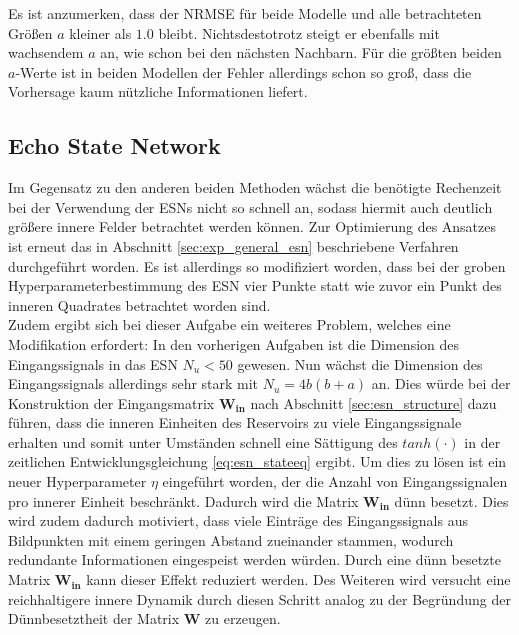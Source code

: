 Es ist anzumerken, dass der NRMSE für beide Modelle und alle betrachteten Größen $a$ kleiner als $1.0$ bleibt. Nichtsdestotrotz steigt er ebenfalls mit wachsendem $a$ an, wie schon bei den nächsten Nachbarn. Für die größten beiden $a$-Werte ist in beiden Modellen der Fehler allerdings schon so groß, dass die Vorhersage kaum nützliche Informationen liefert.

\FloatBarrier
\subsection{Echo State Network}
Im Gegensatz zu den anderen beiden Methoden wächst die benötigte Rechenzeit bei der Verwendung der \textsc{ESN}s nicht so schnell an, sodass hiermit auch deutlich größere innere Felder betrachtet werden können. Zur Optimierung des Ansatzes ist erneut das in Abschnitt \ref{sec:exp_general_esn} beschriebene Verfahren durchgeführt worden. Es ist allerdings so modifiziert worden, dass bei der groben Hyperparameterbestimmung des \textsc{ESN} vier Punkte statt wie zuvor ein Punkt des inneren Quadrates betrachtet worden sind.\\

Zudem ergibt sich bei dieser Aufgabe ein weiteres Problem, welches eine Modifikation erfordert: In den vorherigen Aufgaben ist die Dimension des Eingangssignals in das \textsc{ESN} $N_u < 50$ gewesen. Nun wächst die Dimension des Eingangssignals allerdings sehr stark mit $N_u = 4b(b+a)$ an. Dies würde bei der Konstruktion der Eingangsmatrix $\mathbf{W_{in}}$ nach Abschnitt \ref{sec:esn_structure} dazu führen, dass die inneren Einheiten des Reservoirs zu viele Eingangssignale erhalten und somit unter Umständen schnell eine Sättigung des $tanh(\cdot)$ in der zeitlichen Entwicklungsgleichung \ref{eq:esn_stateeq} ergibt. Um dies zu lösen ist ein neuer Hyperparameter $\eta$ eingeführt worden, der die Anzahl von Eingangssignalen pro innerer Einheit beschränkt. Dadurch wird die Matrix $\mathbf{W_{in}}$ dünn besetzt. Dies wird zudem dadurch motiviert, dass viele Einträge des Eingangssignals aus Bildpunkten mit einem geringen Abstand zueinander stammen, wodurch redundante Informationen eingespeist werden würden. Durch eine dünn besetzte Matrix $\mathbf{W_{in}}$ kann dieser Effekt reduziert werden. Des Weiteren wird versucht eine reichhaltigere innere Dynamik durch diesen Schritt analog zu der Begründung der Dünnbesetztheit der Matrix $\mathbf{W}$ zu erzeugen.\\

